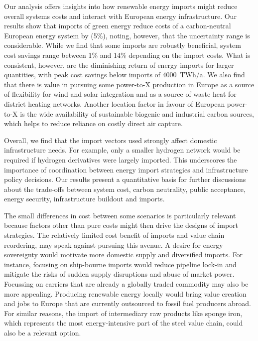 Our analysis offers insights into how renewable energy imports might reduce
overall systems costs and interact with European energy infrastructure. Our
results show that imports of green energy reduce costs of a carbon-neutral
European energy system by  (5\%), noting, however, that the
uncertainty range is considerable. While we find that some imports are robustly
beneficial, system cost savings range between 1\% and 14\% depending on the
import costs. What is consistent, however, are the diminishing return of energy
imports for larger quantities, with peak cost savings below imports of
4000~TWh/a. We also find that there is value in pursuing some \mbox{power-to-X}
production in Europe as a source of flexibility for wind and solar integration
and as a source of waste heat for district heating networks. Another location
factor in favour of European \mbox{power-to-X} is the  wide availability of
sustainable biogenic and industrial carbon sources, which helps to reduce
reliance on costly direct air capture.

Overall, we find that the import vectors used strongly affect domestic
infrastructure needs. For example, only a smaller hydrogen network would be
required if hydrogen derivatives were largely imported. This underscores the
importance of coordination between energy import strategies and infrastructure
policy decisions. Our results present a quantitative basis for further
discussions about the trade-offs between system cost, carbon neutrality, public
acceptance, energy security, infrastructure buildout and imports.

The small differences in cost between some scenarios is particularly relevant
because factors other than pure costs might then drive the designs of import
strategies. The relatively limited cost benefit of imports and value chain
reordering, may speak against pursuing this avenue. A desire for energy
sovereignty would motivate more domestic supply and diversified imports. For
instance, focusing on ship-bourne imports would reduce pipeline lock-in and
mitigate the risks of sudden supply disruptions and abuse of market power.
Focussing on carriers that are already a globally traded commodity may also be
more appealing. Producing renewable energy locally would bring value creation
and jobs to Europe that are currently outsourced to fossil fuel producers
abroad. For similar reasons, the import of intermediary raw products like sponge
iron, which represents the most energy-intensive part of the steel value chain,
could also be a relevant option.

